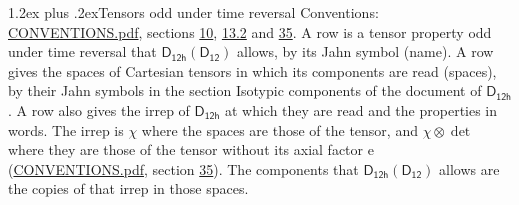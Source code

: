 \documentclass[10pt,a4paper]{article}
\makeatletter
\renewcommand\section{\@startsection{section}{1}{\z@}{-3ex plus -1ex minus -.2ex}%
  {1.2ex plus .2ex}{\normalfont\large\sffamily\bfseries\color{parttitle}}}
\numberwithin{equation}{section}
\newcommand{\grp}[1]{\mathsf{#1}}
\newcommand{\irrprod}{\otimes}
\makeatother
\begin{document}
\section{Tensors odd under time reversal}\label{s:time_odd}
Conventions: \href{../../CONVENTIONS.pdf}{CONVENTIONS.pdf}, sections \href{../../../rotation/CONVENTIONS.pdf\#conv.10}{10}, \href{../../../rotation/CONVENTIONS.pdf\#conv.13.2}{13.2} and \href{../../CONVENTIONS.pdf\#conv.35}{35}.
\leavevmode\label{n:head.name.property}A row is a tensor property odd under time reversal that $\grp{D_{12h}}(\grp{D_{12}})$ allows, by its Jahn symbol (name). \label{n:head.spaces}A row gives the spaces of Cartesian tensors in which its components are read (spaces), by their Jahn symbols in the section Isotypic components of the document of \href{../../../rotation/data/pdf/D12h.pdf}{$\grp{D_{12h}}$}. \label{n:head.properties}A row also gives the irrep of $\grp{D_{12h}}$ at which they are read and the properties in words. The irrep is $\chi$ where the spaces are those of the tensor, and $\chi \irrprod \det$ where they are those of the tensor without its axial factor e (\href{../../CONVENTIONS.pdf}{CONVENTIONS.pdf}, section \href{../../CONVENTIONS.pdf\#conv.35}{35}). The components that $\grp{D_{12h}}(\grp{D_{12}})$ allows are the copies of that irrep in those spaces.
\end{document}
